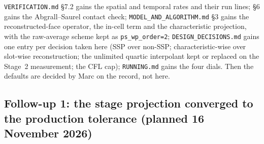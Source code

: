 \documentclass[11pt,a4paper]{article}
\newcommand{\code}[1]{\texttt{\small #1}}
\begin{document}
\code{VERIFICATION.md} \S7.2 gains the spatial and temporal rates and their
run lines; \S6 gains the Abgrall--Saurel contact check; \code{MODEL\_AND\_ALGORITHM.md}
\S3 gains the reconstructed-face operator, the in-cell term and the
characteristic projection, with the raw-average scheme kept as
\code{ps\_wp\_order=2}; \code{DESIGN\_DECISIONS.md} gains one entry per
decision taken here (SSP over non-SSP; characteristic-wise over slot-wise
reconstruction; the unlimited quartic interpolant kept or replaced on the
Stage~2 measurement; the CFL cap); \code{RUNNING.md} gains the four dials.
Then the defaults are decided by Marc on the record, not here.

\subsection*{Follow-up 1: the stage projection converged to the production tolerance (planned 16 November 2026)}
\end{document}
